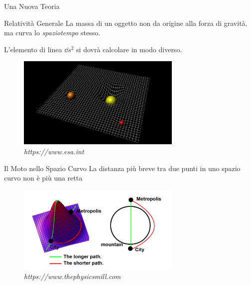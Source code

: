 \begin{frame}{Una Nuova Teoria}

    \begin{block}{Relatività Generale}
        {La massa di un oggetto non da origine alla forza di gravità, ma curva
        lo \textit{spaziotempo} stesso.}
    \end{block}

    L'elemento di linea $\dd s^2$ si dovrà calcolare in modo diverso.

    \begin{figure}
        \centering
        \includegraphics[width=0.7\textwidth]{Figures/spacetime_curvature.jpg}
        \caption{\textit{https://www.esa.int}}%
    \end{figure}

\end{frame}


\begin{frame}{Il Moto nello Spazio Curvo}
    La distanza più breve tra due punti in uno spazio curvo non è più una retta
    \begin{figure}
        \centering
        \includegraphics[width=0.7\textwidth]{Figures/moutain_curved_space.png}
        \caption{\textit{https://www.thephysicsmill.com}}%
    \end{figure}

\end{frame}
